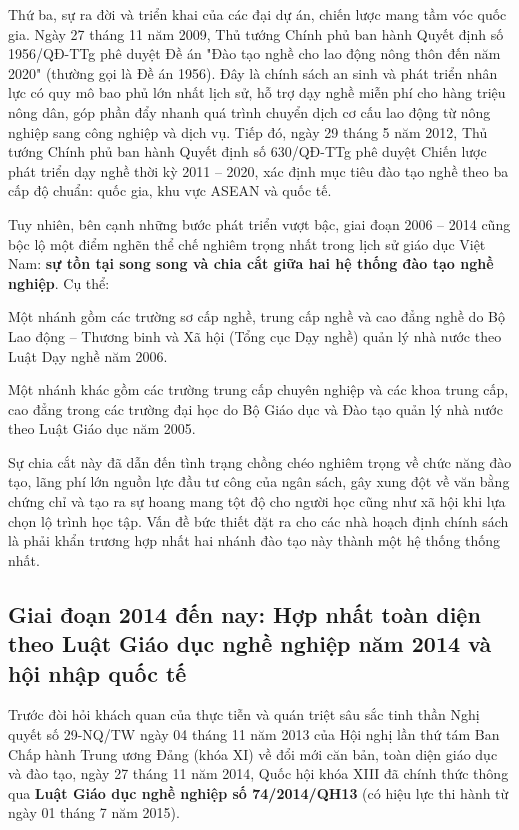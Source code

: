Thứ ba, sự ra đời và triển khai của các đại dự án, chiến lược mang tầm vóc quốc gia. Ngày 27 tháng 11 năm 2009, Thủ tướng Chính phủ ban hành Quyết định số 1956/QĐ-TTg phê duyệt Đề án "Đào tạo nghề cho lao động nông thôn đến năm 2020" (thường gọi là Đề án 1956). Đây là chính sách an sinh và phát triển nhân lực có quy mô bao phủ lớn nhất lịch sử, hỗ trợ dạy nghề miễn phí cho hàng triệu nông dân, góp phần đẩy nhanh quá trình chuyển dịch cơ cấu lao động từ nông nghiệp sang công nghiệp và dịch vụ. Tiếp đó, ngày 29 tháng 5 năm 2012, Thủ tướng Chính phủ ban hành Quyết định số 630/QĐ-TTg phê duyệt Chiến lược phát triển dạy nghề thời kỳ 2011 -- 2020, xác định mục tiêu đào tạo nghề theo ba cấp độ chuẩn: quốc gia, khu vực ASEAN và quốc tế.

Tuy nhiên, bên cạnh những bước phát triển vượt bậc, giai đoạn 2006 -- 2014 cũng bộc lộ một điểm nghẽn thể chế nghiêm trọng nhất trong lịch sử giáo dục Việt Nam: \textbf{sự tồn tại song song và chia cắt giữa hai hệ thống đào tạo nghề nghiệp}. Cụ thể:

Một nhánh gồm các trường sơ cấp nghề, trung cấp nghề và cao đẳng nghề do Bộ Lao động -- Thương binh và Xã hội (Tổng cục Dạy nghề) quản lý nhà nước theo Luật Dạy nghề năm 2006.

Một nhánh khác gồm các trường trung cấp chuyên nghiệp và các khoa trung cấp, cao đẳng trong các trường đại học do Bộ Giáo dục và Đào tạo quản lý nhà nước theo Luật Giáo dục năm 2005.

Sự chia cắt này đã dẫn đến tình trạng chồng chéo nghiêm trọng về chức năng đào tạo, lãng phí lớn nguồn lực đầu tư công của ngân sách, gây xung đột về văn bằng chứng chỉ và tạo ra sự hoang mang tột độ cho người học cũng như xã hội khi lựa chọn lộ trình học tập. Vấn đề bức thiết đặt ra cho các nhà hoạch định chính sách là phải khẩn trương hợp nhất hai nhánh đào tạo này thành một hệ thống thống nhất.

\subsection{Giai đoạn 2014 đến nay: Hợp nhất toàn diện theo Luật Giáo dục nghề nghiệp năm 2014 và hội nhập quốc tế}

Trước đòi hỏi khách quan của thực tiễn và quán triệt sâu sắc tinh thần Nghị quyết số 29-NQ/TW ngày 04 tháng 11 năm 2013 của Hội nghị lần thứ tám Ban Chấp hành Trung ương Đảng (khóa XI) về đổi mới căn bản, toàn diện giáo dục và đào tạo, ngày 27 tháng 11 năm 2014, Quốc hội khóa XIII đã chính thức thông qua \textbf{Luật Giáo dục nghề nghiệp số 74/2014/QH13} (có hiệu lực thi hành từ ngày 01 tháng 7 năm 2015).

